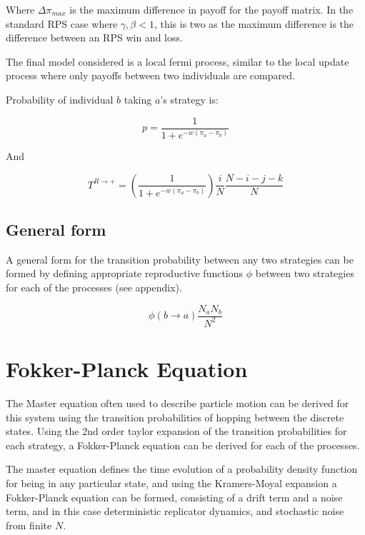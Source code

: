 \documentclass[%
 reprint,
 amsmath,amssymb,
 aps,
]{revtex4-2}
\begin{document}
Where $\Delta \pi_{max}$ is the maximum difference in payoff for the payoff matrix.
In the standard RPS case where $\gamma, \beta < 1$, this is two as the maximum difference
is the difference between an RPS win and loss.


The final model considered is a local
fermi process, similar to the local update process where only 
payoffs between two individuals are compared.

Probability of individual $b$ taking $a$'s strategy is:

\begin{equation}
p = \frac{1}{1 + e^{-w(\pi_a- \pi_b)}} \nonumber
\end{equation}

And 


\begin{equation}
T^{R \rightarrow +} = \left( \frac{1}{1 + e^{-w(\pi_a - \pi_b)}}\right) \frac{i}{N} \frac{N-i-j-k}{N}
\end{equation}


\subsection{General form}

A general form for the transition probability between any two 
strategies can be formed by defining appropriate reproductive functions $\phi$ between 
two strategies for each of the processes (see appendix).

\begin{equation}
  \phi(b \rightarrow a) \frac{N_a N_b}{N^2} \nonumber
\end{equation}



\section{\label{sec:fokker-planck} Fokker-Planck Equation}

The Master equation \cite{alma9933506044604871} often used to 
describe particle motion can be derived for this 
system using the transition probabilities of hopping between the 
discrete states.
Using the 2nd order taylor expansion of the transition probabilities
for each strategy, a Fokker-Planck equation can be derived for each of the processes.


The master equation defines the time evolution of a probability density function
for being in any particular state, 
and using the Kramers-Moyal expansion a Fokker-Planck equation can be formed, 
consisting of a drift term and a noise term, and in this case
deterministic replicator dynamics, and stochastic noise from finite $N$.
\end{document}
